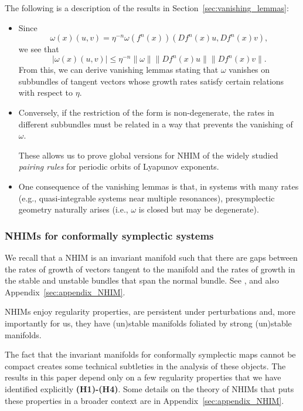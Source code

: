 \documentclass[11pt]{amsart}
\theoremstyle{definition}
\theoremstyle{remark}
\numberwithin{equation}{section}
\begin{document}
The following is a description of the results in  Section~\ref{sec:vanishing_lemmas}:
\begin{itemize}
 \item
 Since
 \[
 \omega (x)(u,v) = \eta^{-n} \omega (f^n(x)) ( Df^n(x) u, Df^n(x)v),
 \]
 we see that
 \[
 |\omega (x) (u,v)|  \le \eta^{-n} \|\omega\| \| Df^n(x)u\| \|Df^n(x)v\|.
 \]
From this, we can derive vanishing lemmas stating that
$\omega$ vanishes on subbundles of tangent vectors whose growth rates satisfy certain relations with respect to $\eta$.

\item
   Conversely, if the restriction of the form is non-degenerate, the rates in different subbundles must be related in a way that prevents the vanishing of $\omega$.

   These allows us to prove  global versions  for NHIM of the
   widely studied \emph{pairing rules} \cite{Dessler88,dettmann1996proof,
     wojtkowski1998conformally} for periodic orbits of Lyapunov
   exponents.
 \item
   One consequence of the vanishing lemmas is that, in systems with many rates (e.g., quasi-integrable systems near multiple resonances), presymplectic geometry naturally arises (i.e., $\omega$ is closed but may be degenerate).
 \end{itemize}

\subsubsection{ NHIMs for conformally symplectic systems}


   We recall that a NHIM is an
   invariant manifold  such that there are gaps between the rates of growth
   of vectors tangent to the manifold  and the rates of growth in
     the stable and unstable bundles that span the normal
    bundle.  See \cite{Fenichel71,Fenichel74,Fenichel77,Pesin,BatesLZ08}, and also Appendix~\ref{sec:appendix_NHIM}.

  NHIMs   enjoy regularity properties,
   are persistent under perturbations and, more importantly for us,
   they have (un)stable manifolds
   foliated by strong (un)stable manifolds.


   The fact that the  invariant manifolds for conformally symplectic maps cannot be compact creates some technical
   subtleties in the  analysis of these objects. The results in this paper
   depend only on a few regularity properties that we have identified explicitly
   {\bf (H1)-(H4)}. Some details on the theory  of NHIMs  that puts these properties in
   a broader context are in Appendix~\ref{sec:appendix_NHIM}.
\end{document}
